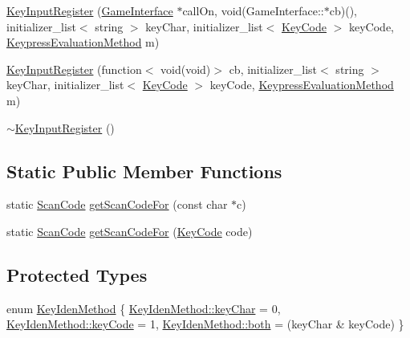 \begin{DoxyCompactItemize}
\item 
\hyperlink{class_key_input_register_abe0349140084c11d90cdf3f56278407f}{Key\-Input\-Register} (\hyperlink{class_game_interface}{Game\-Interface} $\ast$call\-On, void(Game\-Interface\-::$\ast$cb)(), initializer\-\_\-list$<$ string $>$ key\-Char, initializer\-\_\-list$<$ \hyperlink{_input_8hpp_ad39c2e59d8cf6782d7ab90b73c0d0ada}{Key\-Code} $>$ key\-Code, \hyperlink{_input_8hpp_ac32d0351518cb71146a1cd777bc4fc91}{Keypress\-Evaluation\-Method} m)
\item 
\hyperlink{class_key_input_register_a255b4fcfd7ff93d8c81c4963dc77d424}{Key\-Input\-Register} (function$<$ void(void)$>$ cb, initializer\-\_\-list$<$ string $>$ key\-Char, initializer\-\_\-list$<$ \hyperlink{_input_8hpp_ad39c2e59d8cf6782d7ab90b73c0d0ada}{Key\-Code} $>$ key\-Code, \hyperlink{_input_8hpp_ac32d0351518cb71146a1cd777bc4fc91}{Keypress\-Evaluation\-Method} m)
\item 
\hyperlink{class_key_input_register_a5c01a99075e25878f2cb673d6341861b}{$\sim$\-Key\-Input\-Register} ()
\end{DoxyCompactItemize}
\subsection*{Static Public Member Functions}
\begin{DoxyCompactItemize}
\item 
static \hyperlink{_input_8hpp_ab11de2748648ed8559e324a4b8dfb2da}{Scan\-Code} \hyperlink{class_key_input_register_a439b37fd3322d8957aa95d9775550db5}{get\-Scan\-Code\-For} (const char $\ast$c)
\item 
static \hyperlink{_input_8hpp_ab11de2748648ed8559e324a4b8dfb2da}{Scan\-Code} \hyperlink{class_key_input_register_a4f8b4b7572911432931bf6bd835f52ef}{get\-Scan\-Code\-For} (\hyperlink{_input_8hpp_ad39c2e59d8cf6782d7ab90b73c0d0ada}{Key\-Code} code)
\end{DoxyCompactItemize}
\subsection*{Protected Types}
\begin{DoxyCompactItemize}
\item 
enum \hyperlink{class_key_input_register_a21a7be17fdf11de9736f801ed23b3d5d}{Key\-Iden\-Method} \{ \hyperlink{class_key_input_register_a21a7be17fdf11de9736f801ed23b3d5dacf1e24867419a579f668008e39431010}{Key\-Iden\-Method\-::key\-Char} = 0, 
\hyperlink{class_key_input_register_a21a7be17fdf11de9736f801ed23b3d5dab96beb1fb95f7fa45257bb48942aef8a}{Key\-Iden\-Method\-::key\-Code} = 1, 
\hyperlink{class_key_input_register_a21a7be17fdf11de9736f801ed23b3d5daf6cb3e816496528d4187db53bc66567f}{Key\-Iden\-Method\-::both} = (key\-Char \& key\-Code)
 \}
\end{DoxyCompactItemize}
